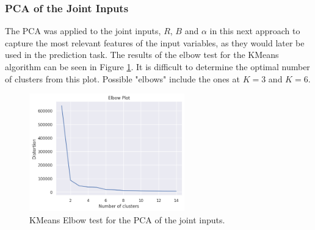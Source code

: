 \subsubsection{PCA of the Joint Inputs}\label{sec:pca_joint}
The PCA was applied to the joint inputs, $R$, $B$ and $\alpha$ in this next approach to capture the most relevant features of the input variables, as they would later be used in the prediction task. The results of the elbow test for the KMeans algorithm can be seen in Figure \ref{fig:pca_joint_elbow}. It is difficult to determine the optimal number of clusters from this plot. Possible "elbows" include the ones at $K=3$ and $K=6$.

\begin{figure}[h]
    \caption{KMeans Elbow test for the PCA of the joint inputs.}
    \label{fig:pca_joint_elbow}
    \includegraphics[width=0.6\textwidth]{figures/pca_joint_elbow_test.png}
\end{figure}

